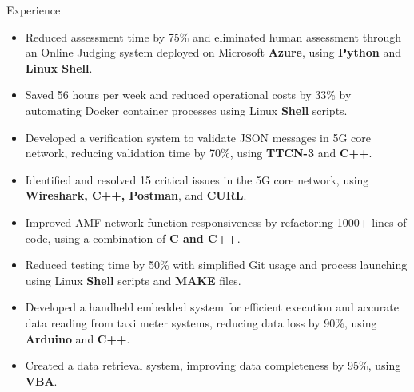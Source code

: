 \documentclass{resume} %
\begin{document}
\begin{workSection}{Experience}
      \experienceItem[
      company=CodePro Education \& Universities,
      location=Taichung{,} TW,
      position=Software Engineer,
      duration=Dec. 2019 – Dec. 2020
      ]
      \vspace{-0.65em}
      \begin{itemize}
            \itemsep -6pt {}
            \item Reduced assessment time by 75\% and eliminated human assessment through an Online Judging system deployed on Microsoft \textbf{Azure}, using \textbf{Python} and \textbf{Linux Shell}.
            \item Saved 56 hours per week and reduced operational costs by 33\% by automating Docker container processes using Linux \textbf{Shell} scripts.
      \end{itemize}

      \experienceItem[
      company=Free5gc department of NCTU,
      location=Hsinchu{,} TW,
      position=Back End Engineer,
      duration=Jul. 2019 – Nov. 2019
      ]
      \vspace{-0.65em}
      \begin{itemize}
            \itemsep -6pt {}
            \item Developed a verification system to validate JSON messages in 5G core network, reducing validation time by 70\%, using \textbf{TTCN-3} and \textbf{C++}.
            \item Identified and resolved 15 critical issues in the 5G core network, using \textbf{Wireshark, C++, Postman}, and \textbf{CURL}.
            \item Improved AMF network function responsiveness by refactoring 1000+ lines of code, using a combination of \textbf{C and C++}.
            \item Reduced testing time by 50\% with simplified Git usage and process launching using Linux \textbf{Shell} scripts and \textbf{MAKE} files.
      \end{itemize}

      \experienceItem[
      company=Ministry of Transportation and Communications TW \& NCTU,
      location=Taipei{,} TW,
      position=Embedded System Engineer,
      duration=Jun. 2016 – Sep. 2016
      ]
      \vspace{-0.65em}
      \begin{itemize}
            \itemsep -6pt {}
            \item Developed a handheld embedded system for efficient execution and accurate data reading from taxi meter systems, reducing data loss by 90\%, using \textbf{Arduino} and \textbf{C++}.
            \item Created a data retrieval system, improving data completeness by 95\%, using \textbf{VBA}.
      \end{itemize}

\end{workSection}

\education{
\educationItem[
university=National Chiao Tung University (NCTU),
location=Hsinchu{,} TW,
program=B.S.{,} Computer Science,
graduation=2018
]
}
\end{document}
